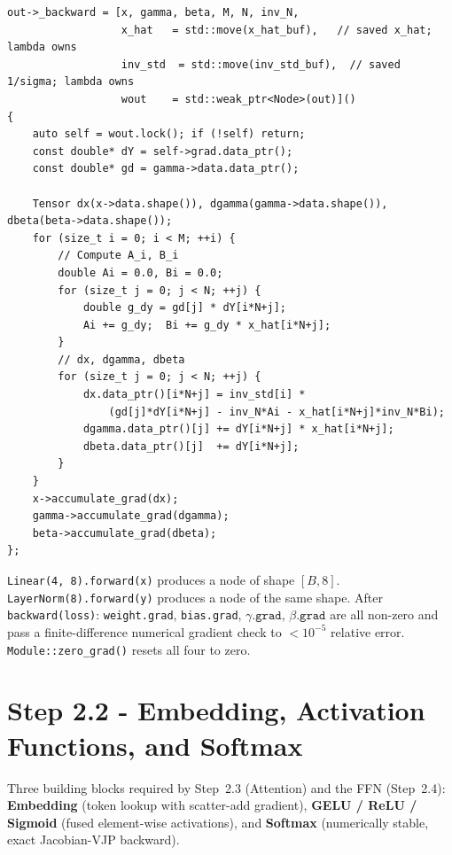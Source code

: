 \documentclass[12pt, a4paper]{article}
\begin{document}
\begin{lstlisting}[caption={\texttt{layernorm\_op} backward lambda (C++17 init-captures)}]
out->_backward = [x, gamma, beta, M, N, inv_N,
                  x_hat   = std::move(x_hat_buf),   // saved x_hat; lambda owns
                  inv_std  = std::move(inv_std_buf),  // saved 1/sigma; lambda owns
                  wout    = std::weak_ptr<Node>(out)]()
{
    auto self = wout.lock(); if (!self) return;
    const double* dY = self->grad.data_ptr();
    const double* gd = gamma->data.data_ptr();

    Tensor dx(x->data.shape()), dgamma(gamma->data.shape()), dbeta(beta->data.shape());
    for (size_t i = 0; i < M; ++i) {
        // Compute A_i, B_i
        double Ai = 0.0, Bi = 0.0;
        for (size_t j = 0; j < N; ++j) {
            double g_dy = gd[j] * dY[i*N+j];
            Ai += g_dy;  Bi += g_dy * x_hat[i*N+j];
        }
        // dx, dgamma, dbeta
        for (size_t j = 0; j < N; ++j) {
            dx.data_ptr()[i*N+j] = inv_std[i] *
                (gd[j]*dY[i*N+j] - inv_N*Ai - x_hat[i*N+j]*inv_N*Bi);
            dgamma.data_ptr()[j] += dY[i*N+j] * x_hat[i*N+j];
            dbeta.data_ptr()[j]  += dY[i*N+j];
        }
    }
    x->accumulate_grad(dx);
    gamma->accumulate_grad(dgamma);
    beta->accumulate_grad(dbeta);
};
\end{lstlisting}

\begin{tcolorbox}[exitbox, title={Step 2.1 - Exit Criterion (met)}]
  \texttt{Linear(4, 8).forward(x)} produces a node of shape \([B, 8]\).
  \texttt{LayerNorm(8).forward(y)} produces a node of the same shape.
  After \texttt{backward(loss)}: \texttt{weight.grad}, \texttt{bias.grad},
  \(\gamma\texttt{.grad}\), \(\beta\texttt{.grad}\) are all non-zero and
  pass a finite-difference numerical gradient check to \(<10^{-5}\) relative
  error.  \texttt{Module::zero\_grad()} resets all four to zero.
\end{tcolorbox}

\section{Step 2.2 - Embedding, Activation Functions, and Softmax}

\begin{tcolorbox}[designbox, title={Step 2.2 Goal}]
  Three building blocks required by Step~2.3 (Attention) and the FFN
  (Step~2.4): \textbf{Embedding} (token lookup with scatter-add gradient),
  \textbf{GELU / ReLU / Sigmoid} (fused element-wise activations), and
  \textbf{Softmax} (numerically stable, exact Jacobian-VJP backward).
\end{tcolorbox}
\end{document}
